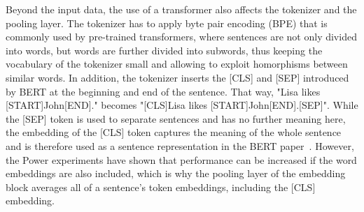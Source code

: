 Beyond the input data, the use of a transformer also affects the tokenizer and the pooling layer. The tokenizer has to apply byte pair encoding (BPE) that is commonly used by pre-trained transformers, where sentences are not only divided into words, but words are further divided into subwords, thus keeping the vocabulary of the tokenizer small and allowing to exploit homorphisms between similar words. In addition, the tokenizer inserts the [CLS] and [SEP] introduced by BERT at the beginning and end of the sentence. That way, "Lisa likes [START]John[END]." becomes "[CLS]Lisa likes [START]John[END].[SEP]". While the [SEP] token is used to separate sentences and has no further meaning here, the embedding of the [CLS] token captures the meaning of the whole sentence and is therefore used as a sentence representation in the BERT paper~\cite{Devlin2019BERTPO}. However, the Power experiments have shown that performance can be increased if the word embeddings are also included, which is why the pooling layer of the embedding block averages all of a sentence's token embeddings, including the [CLS] embedding.
